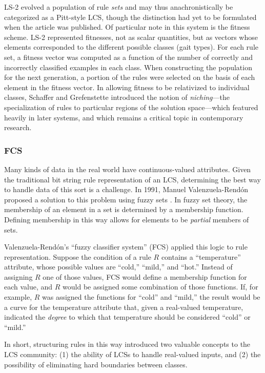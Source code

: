 \documentclass[12pt]{article}
\begin{document}
LS-2 evolved a population of rule \emph{sets} and may thus anachronistically be categorized as a Pitt-style LCS, though the distinction had yet to be formulated when the article was published. Of particular note in this system is the fitness scheme. LS-2 represented fitnesses, not as scalar quantities, but as vectors whose elements corresponded to the different possible classes (gait types). For each rule set, a fitness vector was computed as a function of the number of correctly and incorrectly classified examples in each class. When constructing the population for the next generation, a portion of the rules were selected on the basis of each element in the fitness vector. In allowing fitness to be relativized to individual classes, Schaffer and Grefenstette introduced the notion of \emph{niching}---the specialization of rules to particular regions of the solution space---which  featured heavily in later systems, and which remains a critical topic in contemporary research.

\subsubsection{FCS}

Many kinds of data in the real world have continuous-valued attributes. Given the traditional bit string rule representation of an LCS, determining the best way to handle data of this sort is a challenge. In 1991, Manuel Valenzuela-Rend\'on proposed a solution to this problem using fuzzy sets \cite{manuel_valenzuela-rendon_fuzzy_1991}. In fuzzy set theory, the membership of an element in a set is determined by a membership function. Defining membership in this way allows for elements to be \emph{partial} members of sets.

Valenzuela-Rend\'on's ``fuzzy classifier system'' (FCS) applied this logic to rule representation. Suppose the condition of a rule $R$ contains a ``temperature'' attribute, whose possible values are ``cold,'' ``mild,'' and ``hot.'' Instead of assigning $R$ one of those values, FCS would define a membership function for each value, and $R$ would be assigned some combination of those functions. If, for example, $R$ was assigned the functions for ``cold'' and ``mild,'' the result would be a curve for the temperature attribute that, given a real-valued temperature, indicated the \emph{degree} to which that temperature should be considered ``cold'' or ``mild.''

In short, structuring rules in this way introduced two valuable concepts to the LCS community: (1) the ability of LCSs to handle real-valued inputs, and (2) the possibility of eliminating hard boundaries between classes.
\end{document}
